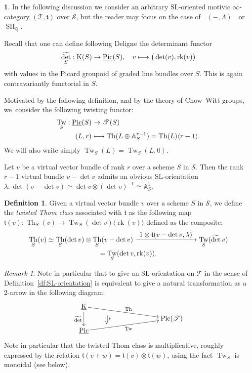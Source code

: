 \documentclass[11pt]{article}
\numberwithin{equation}{section}\renewcommand{\encodingdefault}{TU}
\def\To#1{\mathchoice{\xrightarrow{\textstyle\kern4pt#1\kern3pt}}{\stackrel{#1}{\longrightarrow}}{}{}}
\def\mto{\mathchoice{\longmapsto}{\mapsto}{\mapsto}{\mapsto}}
\newcommand{\base}{\mathscr S}
\newcommand{\T}{\mathscr T}
\DeclareMathOperator{\uK}{\underline K}
\DeclareMathOperator{\uPic}{\underline{Pic}}
\DeclareMathOperator{\rk}{rk}
\renewcommand{\AA}{\mathbb A}
\newcommand{\SL}{\mathrm{SL}}
\newcommand{\thom}{\mathfrak t}
\DeclareMathOperator{\SH}{SH}
\DeclareMathOperator{\DA}{D_{\AA^1}}
\DeclareMathOperator{\Pic}{Pic}
\newcommand{\twist}[1]{\langle #1 \rangle}
\DeclareMathOperator{\Th}{Th}
\DeclareMathOperator{\Tw}{Tw}
\DeclareMathOperator{\tdet}{\widetilde \det}
\newcommand{\QQ} {\mathbb Q}
\theoremstyle{remark}
\newtheorem{rem}[thm]{Remark}
\theoremstyle{definition}
\newtheorem{df}[thm]{Definition}
\newtheorem{num}[thm]{}
\numberwithin{equation}{thm}
\begin{document}
\begin{num}
\label{num:grdet}
In the following discussion we consider an arbitrary $\SL$-oriented motivic $\infty$\nobreakdash-category $(\T,\thom)$ over $\base$,
but the reader may focus on the case of $\DA(-,\Lambda)_-$ or~$\SH_\QQ$.

Recall that one can define following Deligne \cite{Del} the determinant functor
\[
\tdet_S:\uK(S) \to \uPic(S),\quad v \mto \big(\det(v),\rk(v)\big)
\]
with values in the Picard groupoid of graded line bundles over $S$. This is again contravariantly functorial in $S$.

Motivated by the following definition, and by the theory of Chow--Witt groups,
we~consider the following twisting functor:
\begin{equation*}
\begin{split}
\Tw_S:\uPic(S) &\to \T(S) \\
(L,r) &\mto \Th(L \oplus \AA^{r-1}_S)=\Th(L)\twist{r-1}.
\end{split}
\end{equation*}
We will also write simply $\Tw_S(L)=\Tw_S(L,0)$.

Let $v$ be a virtual vector bundle of rank $r$ over a scheme $S$ in $\base$.
Then the rank $r-1$ virtual bundle $v-\det v$
admits an obvious $\SL$-orientation
$\lambda:\det(v-\det v) \simeq \det v \otimes (\det v)^{-1} \simeq \AA^1_S$.
\end{num}
\begin{df}
Given a virtual vector bundle $v$ over a scheme $S$ in $\base$,
we define the \emph{twisted Thom class} associated with $\thom$ as the following map $\thom(v) : \Th_S(v) \to \Tw_S(\det v)\langle \rk(v)\rangle$ defined as the composite:
\begin{multline*}
\Th_S(v) \simeq \Th_S(\det v) \otimes \Th_S(v-\det v)
\To{1 \otimes \thom(v-\det v,\lambda)} \Tw_S(\tdet v) \\
=\Tw_S(\det v,\rk(v)).
\end{multline*}
\end{df}

\begin{rem}\label{rem:weak_orientation}
Note in particular that to give an $\SL$-orientation on $\T$
in the sense of Definition~\ref{df:SL-orientation}
is equivalent to give a natural transformation as a 2-arrow in the following diagram:
\[
\xymatrix@C=20pt@R=-2pt{
\uK\ar^{\Th}[rrrrdd]\ar_{\tdet}[dddd] &&&& \\
& \ar@{=>}^{\thom}[dd] & & & \\
&&&& \Pic(\T)\\
&&&& \\
\uPic\ar_{\Tw}[rrrruu] &&&&
}
\]
Note in particular that the twisted Thom class is multiplicative, roughly expressed by the relation
$\thom(v+w)=\thom(v) \otimes \thom(w)$, using the fact $\Tw_S$ is monoidal (see below).
\end{rem}
\end{document}
